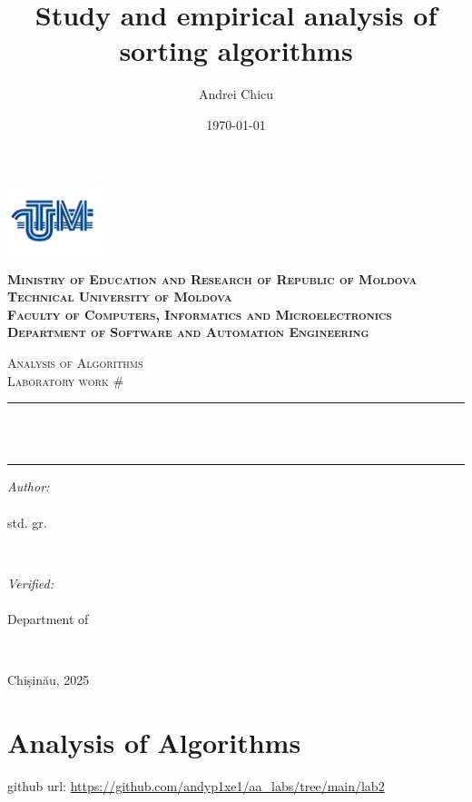\documentclass[a4paper,12pt]{article}
\author{Andrei Chicu}
\date{\today}
\title{Study and empirical analysis of sorting algorithms}
\begin{document}
\makeatletter
\begin{titlepage}
\centering

\includegraphics[height=2cm]{utm_logo.png}

\bfseries
\textsc{Ministry of Education and Research of Republic of Moldova} \\
\textsc{Technical University of Moldova} \\
\textsc{Faculty of Computers, Informatics and Microelectronics} \\
\textsc{Department of Software and Automation Engineering} \\
\mdseries

\vfill

\textsc{\Large Analysis of Algorithms} \\
\textsc{\large Laboratory work \#\@labno}\\[0.5cm]

\vspace{12pt}
\newcommand{\HRule}{\rule{\linewidth}{0.5mm}}
\HRule \\[0.2cm]
{ \LARGE \bfseries \@title }\\[0.4cm]
\HRule
\vfill

\begin{minipage}[t]{0.4\textwidth}
\begin{flushleft} \large
\emph{Author:} \\
\@author\\                        
std. gr. \@group
\end{flushleft}
\end{minipage}
~
\begin{minipage}[t]{0.4\textwidth}
\raggedleft \large
\emph{Verified:} \\
\@prof \\
Department of \textsc{\@profdep}
\end{minipage}\\[3cm]
\vfill

Chișinău, 2025
\end{titlepage}
\makeatother
\setcounter{page}{2}
\section{Analysis of Algorithms}
\label{sec:orgb35dc2c}
github url: \url{https://github.com/andyp1xe1/aa_labs/tree/main/lab2}
\end{document}
